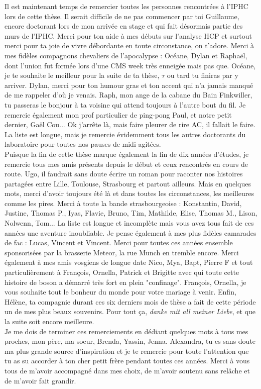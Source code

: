 Il est maintenant temps de remercier toutes les personnes rencontrées à l'IPHC lors de cette thèse. Il serait difficile de ne pas commencer par toi Guillaume, encore doctorant lors de mon arrivée en stage et qui fait désormais partie des murs de l'IPHC. Merci pour ton aide à mes débuts sur l'analyse HCP et surtout merci pour ta joie de vivre débordante en toute circonstance, on t'adore. Merci à mes fidèles compagnons chevaliers de l'apocalypse : Océane, Dylan et Raphaël, dont l'union fut formée lors d'une CMS week très enneigée mais pas que. Océane, je te souhaite le meilleur pour la suite de ta thèse, $\tau$ ou tard tu finiras par y arriver. Dylan, merci pour ton humour gras et ton accent qui n'a jamais manqué de me rappeler d'où je venais. Raph, mon ange de la cabane du Bain Finkwiller, tu passeras le bonjour à ta voisine qui attend toujours à l'autre bout du fil. Je remercie également mon prof particulier de ping-pong Paul, et notre petit dernier, Gaël Cou... Ok j'arrête là, mais faire pleurer de rire AC, il fallait le faire. La liste est longue, mais je remercie évidemment tous les autres doctorants du laboratoire pour toutes nos pauses de midi agitées. \\

Puisque la fin de cette thèse marque également la fin de dix années d'études, je remercie tous mes amis présents depuis le début et ceux rencontrés en cours de route. Ugo, il faudrait sans doute écrire un roman pour raconter nos histoires partagées entre Lille, Toulouse, Strasbourg et partout ailleurs. Mais en quelques mots, merci d'avoir toujours été là et dans toutes les circonstances, les meilleures comme les pires. Merci à toute la bande strasbourgeoise : Konstantin, David, Justine, Thomas P., Iyas, Flavie, Bruno, Tim, Mathilde, Elise, Thomas M., Lison, Nolwenn, Tom... La liste est longue et incomplète mais vous avez tous fait de ces années une aventure inoubliable. Je pense également à mes plus fidèles camarades de fac : Lucas, Vincent et Vincent. Merci pour toutes ces années ensemble sponsorisées par la brasserie Meteor, la rue Munch en tremble encore. Merci également à mes amis vosgiens de longue date Nico, Mya, Bapt, Pierre F et tout particulièrement à François, Ornella, Patrick et Brigitte avec qui toute cette histoire de boson a démarré très fort en plein "confinage". François, Ornella, je vous souhaite tout le bonheur du monde pour votre mariage à venir. Enfin, Hélène, ta compagnie durant ces six derniers mois de thèse a fait de cette période un de mes plus beaux souvenirs. Pour tout ça, \textit{danke mit all meiner Liebe}, et que la suite soit encore meilleure. \\

Je me dois de terminer ces remerciements en dédiant quelques mots à tous mes proches, mon père, ma soeur, Brenda, Yassin, Jenna. Alexandra, tu es sans doute ma plus grande source d'inspiration et je te remercie pour toute l'attention que tu as su accorder à ton cher petit frère pendant toutes ces années. Merci à vous tous de m'avoir accompagné dans mes choix, de m'avoir soutenu sans relâche et de m'avoir fait grandir.  




